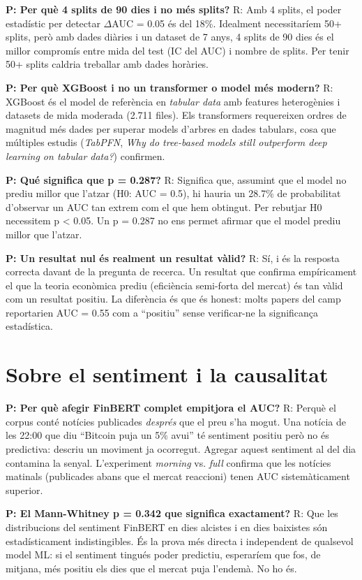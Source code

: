 \documentclass[12pt, a4paper]{report}
\begin{document}
\textbf{P: Per què 4 splits de 90 dies i no més splits?}
R: Amb 4 splits, el poder estadístic per detectar $\Delta$AUC = 0.05 és del 18\%. Idealment necessitaríem 50+ splits, però amb dades diàries i un dataset de 7 anys, 4 splits de 90 dies és el millor compromís entre mida del test (IC del AUC) i nombre de splits. Per tenir 50+ splits caldria treballar amb dades horàries.

\textbf{P: Per què XGBoost i no un transformer o model més modern?}
R: XGBoost és el model de referència en \textit{tabular data} amb features heterogènies i datasets de mida moderada (2.711 files). Els transformers requereixen ordres de magnitud més dades per superar models d'arbres en dades tabulars, cosa que múltiples estudis (\textit{TabPFN}, \textit{Why do tree-based models still outperform deep learning on tabular data?}) confirmen.

\textbf{P: Qué significa que p = 0.287?}
R: Significa que, assumint que el model no prediu millor que l'atzar (H0: AUC = 0.5), hi hauria un 28.7\% de probabilitat d'observar un AUC tan extrem com el que hem obtingut. Per rebutjar H0 necessitem p < 0.05. Un p = 0.287 no ens permet afirmar que el model prediu millor que l'atzar.

\textbf{P: Un resultat nul és realment un resultat vàlid?}
R: Sí, i és la resposta correcta davant de la pregunta de recerca. Un resultat que confirma empíricament el que la teoria econòmica prediu (eficiència semi-forta del mercat) és tan vàlid com un resultat positiu. La diferència és que és honest: molts papers del camp reportarien AUC = 0.55 com a ``positiu'' sense verificar-ne la significança estadística.

\section*{Sobre el sentiment i la causalitat}

\textbf{P: Per què afegir FinBERT complet empitjora el AUC?}
R: Perquè el corpus conté notícies publicades \textit{després} que el preu s'ha mogut. Una notícia de les 22:00 que diu ``Bitcoin puja un 5\% avui'' té sentiment positiu però no és predictiva: descriu un moviment ja ocorregut. Agregar aquest sentiment al del dia contamina la senyal. L'experiment \textit{morning} vs. \textit{full} confirma que les notícies matinals (publicades abans que el mercat reaccioni) tenen AUC sistemàticament superior.

\textbf{P: El Mann-Whitney p = 0.342 que significa exactament?}
R: Que les distribucions del sentiment FinBERT en dies alcistes i en dies baixistes són estadísticament indistingibles. És la prova més directa i independent de qualsevol model ML: si el sentiment tingués poder predictiu, esperaríem que fos, de mitjana, més positiu els dies que el mercat puja l'endemà. No ho és.
\end{document}
